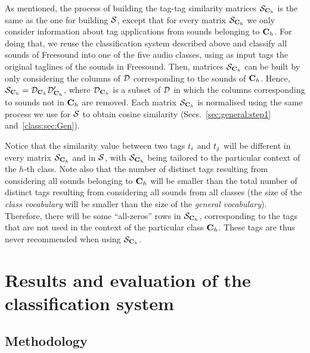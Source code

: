 As mentioned, the process of building the tag-tag similarity matrices $\mathcal{S}_{\mathbf{C}_{h}}$ is the same as the one for building $\mathcal{S}$, except that for every matrix $\mathcal{S}_{\mathbf{C}_{h}}$ we only consider information about tag applications from sounds belonging to $\mathbf{C}_{h}$. 
For doing that, we reuse the classification system described above and classify all sounds of Freesound into one of the five audio classes, using as input tags the original taglines of the sounds in Freesound.  
Then, matrices $\mathcal{S}_{\mathbf{C}_{h}}$ can be built by only considering the columns of $\mathcal{D}$ corresponding to the sounds of $\mathbf{C}_{h}$. Hence, $\mathcal{S}_{\mathbf{C}_{h}} = \mathcal{D}_{\mathbf{C}_{h}}\mathcal{D}_{\mathbf{C}_{h}}'$, where $\mathcal{D}_{\mathbf{C}_{h}}$ is a subset of $\mathcal{D}$ in which the columns corresponding to sounds not in $\mathbf{C}_{h}$ are removed.
Each matrix $\mathcal{S}_{\mathbf{C}_{h}}$ is normalised using the same process we use for $\mathcal{S}$ to obtain cosine similarity (Secs.~\ref{sec:general:step1} and~\ref{class:sec:Gen}). 

Notice that the similarity value between two tags $t_i$ and $t_j$ will be different in every matrix $\mathcal{S}_{\mathbf{C}_{h}}$ and in $\mathcal{S}$, with $\mathcal{S}_{\mathbf{C}_{h}}$ being tailored to the particular context of the $h$-th class. Note also that the number of distinct tags resulting from considering all sounds belonging to $\mathbf{C}_{h}$ will be smaller than the total number of distinct tags resulting from considering all sounds from all classes (the size of the \emph{class vocabulary} will be smaller than the size of the \emph{general vocabulary}). Therefore, there will be some ``all-zeros'' rows in $\mathcal{S}_{\mathbf{C}_{h}}$, corresponding to the tags that are not used in the context of the particular class $\mathbf{C}_{h}$. These tags are thus never recommended when using $\mathcal{S}_{\mathbf{C}_{h}}$.

\section[Results and evaluation of the classification system][Results and eval. of the classification system]{Results and evaluation of the classification system}
\label{class:sec:evaluation_classifier}

\subsection{Methodology}
\label{class:sec:evaluation_classifier_method}

